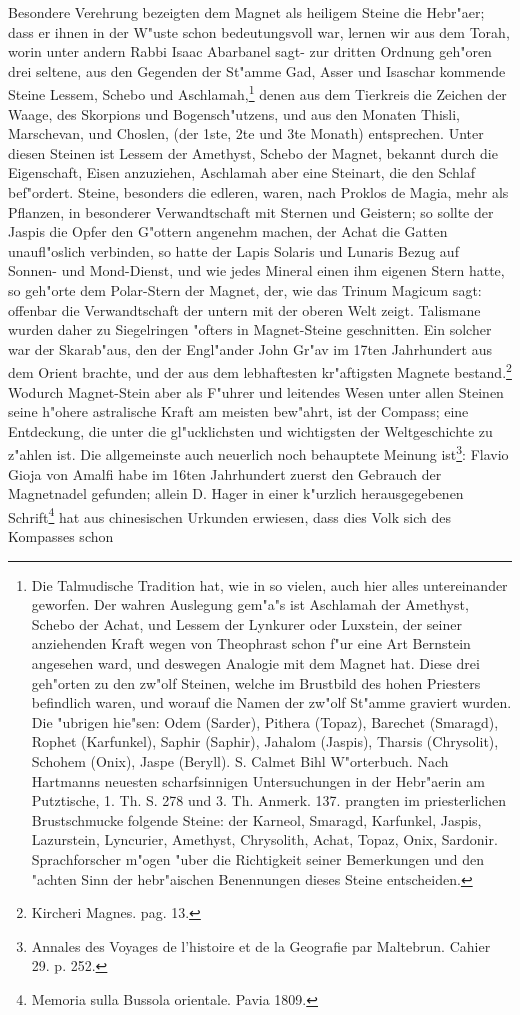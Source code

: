\documentclass[a4paper, 11pt, oneside, polutonikogreek, german]{article}
\begin{document}
Besondere Verehrung bezeigten dem Magnet als heiligem Steine die Hebr"aer; dass er ihnen in der W"uste schon bedeutungsvoll war, lernen wir aus dem Torah, worin unter andern Rabbi Isaac Abarbanel sagt- zur dritten Ordnung geh"oren drei seltene, aus den Gegenden der St"amme Gad, Asser und Isaschar kommende Steine Lessem, Schebo und Aschlamah,\footnote{Die Talmudische Tradition hat, wie in so vielen, auch hier alles untereinander geworfen. Der wahren Auslegung gem"a"s ist Aschlamah der Amethyst, Schebo der Achat, und Lessem der Lynkurer oder Luxstein, der seiner anziehenden Kraft wegen von Theophrast schon f"ur eine Art Bernstein angesehen ward, und deswegen Analogie mit dem Magnet hat. Diese drei geh"orten zu den zw"olf Steinen, welche im Brustbild des hohen Priesters befindlich waren, und worauf die Namen der zw"olf St"amme graviert wurden. Die "ubrigen hie"sen: Odem (Sarder), Pithera (Topaz), Barechet (Smaragd), Rophet (Karfunkel), Saphir (Saphir), Jahalom (Jaspis), Tharsis (Chrysolit), Schohem (Onix), Jaspe (Beryll). S. Calmet Bihl W"orterbuch. Nach Hartmanns neuesten scharfsinnigen Untersuchungen in der Hebr"aerin am Putztische, 1. Th. S. 278 und 3. Th. Anmerk. 137. prangten im priesterlichen Brustschmucke folgende Steine: der Karneol, Smaragd, Karfunkel, Jaspis, Lazurstein, Lyncurier, Amethyst, Chrysolith, Achat, Topaz, Onix, Sardonir. Sprachforscher m"ogen "uber die Richtigkeit seiner Bemerkungen und den "achten Sinn der hebr"aischen Benennungen dieses Steine entscheiden.} denen aus dem Tierkreis die Zeichen der Waage, des Skorpions und Bogensch"utzens, und aus den Monaten Thisli, Marschevan, und Choslen, (der 1ste, 2te und 3te Monath) entsprechen. Unter diesen Steinen ist Lessem der Amethyst, Schebo der Magnet, bekannt durch die Eigenschaft, Eisen anzuziehen, Aschlamah aber eine Steinart, die den Schlaf bef"ordert. Steine, besonders die edleren, waren, nach Proklos de Magia, mehr als Pflanzen, in besonderer Verwandtschaft mit Sternen und Geistern; so sollte der Jaspis die Opfer den G"ottern angenehm machen, der Achat die Gatten unaufl"oslich verbinden, so hatte der Lapis Solaris und Lunaris Bezug auf Sonnen- und Mond-Dienst, und wie jedes Mineral einen ihm eigenen Stern hatte, so geh"orte dem Polar-Stern der Magnet, der, wie das Trinum Magicum sagt: offenbar die Verwandtschaft der untern mit der oberen Welt zeigt. Talismane wurden daher zu Siegelringen "ofters in Magnet-Steine geschnitten. Ein solcher war der Skarab"aus, den der Engl"ander John Gr"av im 17ten Jahrhundert aus dem Orient brachte, und der aus dem lebhaftesten kr"aftigsten Magnete bestand.\footnote{Kircheri Magnes. pag. 13.} Wodurch Magnet-Stein aber als F"uhrer und leitendes Wesen unter allen Steinen seine h"ohere astralische Kraft am meisten bew"ahrt, ist der Compass; eine Entdeckung, die unter die gl"ucklichsten und wichtigsten der Weltgeschichte zu z"ahlen ist. Die allgemeinste auch neuerlich noch behauptete Meinung ist\footnote{Annales des Voyages de l'histoire et de la Geografie par Maltebrun. Cahier 29. p. 252.}: Flavio Gioja von Amalfi habe im 16ten Jahrhundert zuerst den Gebrauch der Magnetnadel gefunden; allein D. Hager in einer k"urzlich herausgegebenen Schrift\footnote{Memoria sulla Bussola orientale. Pavia 1809.} hat aus chinesischen Urkunden erwiesen, dass dies Volk sich des Kompasses schon 
\end{document}

